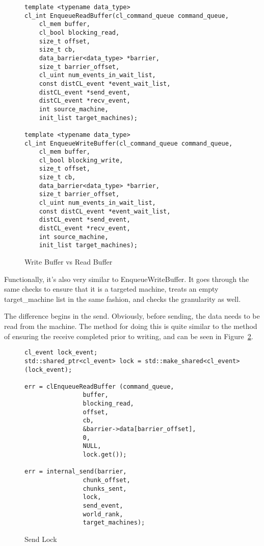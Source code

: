 \documentclass[../thesis.tex]{subfiles}
\begin{document}
            \begin{figure}[htbp]
                \centering
                \lstset{language=cpp}
                \begin{lstlisting}[tabsize=2]
template <typename data_type>
cl_int EnqueueReadBuffer(cl_command_queue command_queue,
    cl_mem buffer,
    cl_bool blocking_read,
    size_t offset,
    size_t cb,
    data_barrier<data_type> *barrier,
    size_t barrier_offset,
    cl_uint num_events_in_wait_list,
    const distCL_event *event_wait_list,
    distCL_event *send_event,
    distCL_event *recv_event,
    int source_machine,
    init_list target_machines);

template <typename data_type>
cl_int EnqueueWriteBuffer(cl_command_queue command_queue,
    cl_mem buffer,
    cl_bool blocking_write,
    size_t offset,
    size_t cb,
    data_barrier<data_type> *barrier,
    size_t barrier_offset,
    cl_uint num_events_in_wait_list,
    const distCL_event *event_wait_list,
    distCL_event *send_event,
    distCL_event *recv_event,
    int source_machine,
    init_list target_machines);
                \end{lstlisting}
            \caption{Write Buffer vs Read Buffer}
            \label{fig:write_vs_read}
            \end{figure}

            Functionally, it's also very similar to EnqueueWriteBuffer. It goes through the same checks to ensure that it is a targeted machine, treats an empty target\_machine list in the same fashion, and checks the granularity as well.

            The difference begins in the send. Obviously, before sending, the data needs to be read from the machine. The method for doing this is quite similar to the method of ensuring the receive completed prior to writing, and can be seen in Figure~\ref{fig:read_before_send}.

            \begin{figure}[htbp]
                \centering
                \lstset{language=cpp}
                \begin{lstlisting}[tabsize=2]
 cl_event lock_event;
std::shared_ptr<cl_event> lock = std::make_shared<cl_event>(lock_event);

err = clEnqueueReadBuffer (command_queue,
                buffer,
                blocking_read,
                offset,
                cb,
                &barrier->data[barrier_offset],
                0,
                NULL,
                lock.get());

err = internal_send(barrier,
                chunk_offset,
                chunks_sent,
                lock,
                send_event,
                world_rank,
                target_machines);
                \end{lstlisting}
            \caption{Send Lock}
            \label{fig:read_before_send}
            \end{figure}
\end{document}
